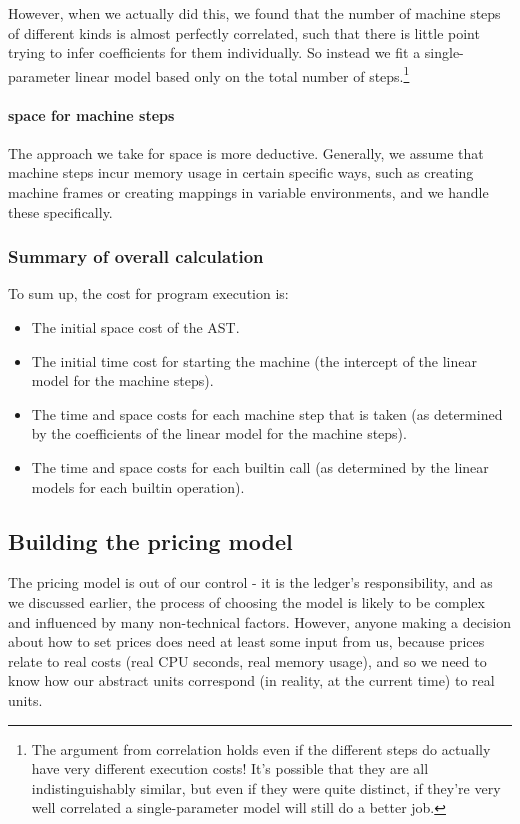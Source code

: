 However, when we actually did this, we found that the number of machine steps of different kinds is almost perfectly correlated, such that there is little point trying to infer coefficients for them individually.
So instead we fit a single-parameter linear model based only on the total number of steps.\footnote{
The argument from correlation holds even if the different steps do actually have very different execution costs!
It's possible that they are all indistinguishably similar, but even if they were quite distinct, if they're very well correlated a single-parameter model will still do a better job.
}

\paragraph{\gls{space} for machine steps}
The approach we take for \gls{space} is more deductive.
Generally, we assume that machine steps incur memory usage in certain specific ways, such as creating machine frames or creating mappings in variable environments, and we handle these specifically.

\subsubsection{Summary of overall calculation}
To sum up, the cost for program execution is:
\begin{itemize}
\item The initial \gls{space} cost of the AST.
\item The initial \gls{time} cost for starting the machine (the intercept of the linear model for the machine steps).
\item The \gls{time} and \gls{space} costs for each machine step that is taken (as determined by the coefficients of the linear model for the machine steps).
\item The \gls{time} and \gls{space} costs for each builtin call (as determined by the linear models for each builtin operation).
\end{itemize}

\subsection{Building the pricing model}
The pricing model is out of our control - it is the ledger's responsibility, and as we discussed earlier, the process of choosing the model is likely to be complex and influenced by many non-technical factors.
However, anyone making a decision about how to set prices does need at least some input from us, because prices relate to real costs (real CPU seconds, real memory usage), and so we need to know how our abstract units correspond (in reality, at the current time) to real units.

